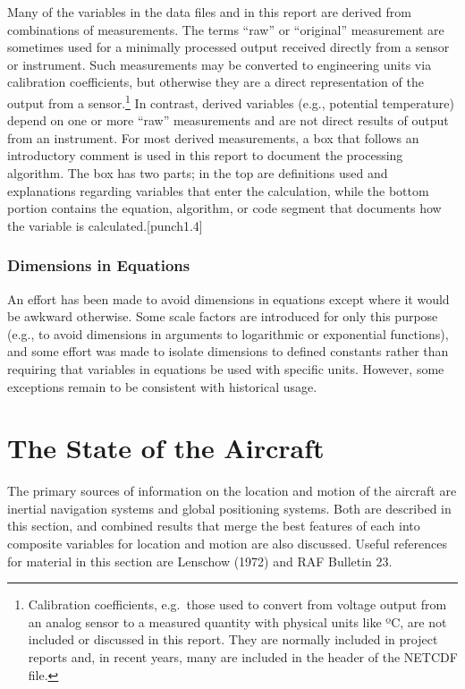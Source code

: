 \documentclass[
  english,
]{book}
\begin{document}
Many of the variables in the data files and in this report are derived from combinations of measurements. The terms ``raw'' or ``original'' measurement are sometimes used for a minimally processed output received directly from a sensor or instrument. Such measurements may be converted to engineering units via calibration coefficients, but otherwise they are a direct representation of the output from a sensor.\footnote{Calibration coefficients, e.g.~those used to convert from voltage output from an analog sensor to a measured quantity with physical units like {º}C, are not included or discussed in this report. They are normally included in project reports and, in recent years, many are included in the header of the NETCDF file.}
In contrast, derived variables (e.g., potential temperature) depend on one or more ``raw'' measurements and are not direct results of output from an instrument. For most derived measurements, a box that follows an introductory comment is used in this report to document the processing algorithm. The box has two parts; in the top are definitions used and explanations regarding variables that enter the calculation, while the bottom portion contains the equation, algorithm, or code segment that documents how the variable is calculated.\protect\hypertarget{punch1.4}{}{{[}punch1.4{]}}

\hypertarget{dimensions-in-equations}{%
\subsection{Dimensions in Equations}\label{dimensions-in-equations}}

An effort has been made to avoid dimensions in equations except where it would be awkward otherwise. Some scale factors are introduced for only this purpose (e.g., to avoid dimensions in arguments to logarithmic or exponential functions), and some effort was made to isolate dimensions to defined constants rather than requiring that variables in equations be used with specific units. However, some exceptions remain to be consistent with historical usage.

\hypertarget{the-state-of-the-aircraft}{%
\chapter{The State of the Aircraft}\label{the-state-of-the-aircraft}}

The primary sources of information on the location and motion of the aircraft are inertial navigation systems and global positioning systems. Both are described in this section, and combined results that merge the best features of each into composite variables for location and motion are also discussed. Useful references for material in this section are Lenschow (1972) and RAF Bulletin 23.
\end{document}

